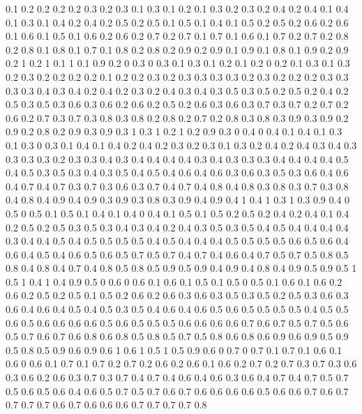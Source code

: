 0.1 0.2
0.2 0.2
0.2 0.3
0.2 0.3
0.1 0.3
0.1 0.2
0.1 0.3
0.2 0.3
0.2 0.4
0.2 0.4
0.1 0.4
0.1 0.3
0.1 0.4
0.2 0.4
0.2 0.5
0.2 0.5
0.1 0.5
0.1 0.4
0.1 0.5
0.2 0.5
0.2 0.6
0.2 0.6
0.1 0.6
0.1 0.5
0.1 0.6
0.2 0.6
0.2 0.7
0.2 0.7
0.1 0.7
0.1 0.6
0.1 0.7
0.2 0.7
0.2 0.8
0.2 0.8
0.1 0.8
0.1 0.7
0.1 0.8
0.2 0.8
0.2 0.9
0.2 0.9
0.1 0.9
0.1 0.8
0.1 0.9
0.2 0.9
0.2 1
0.2 1
0.1 1
0.1 0.9
0.2 0
0.3 0
0.3 0.1
0.3 0.1
0.2 0.1
0.2 0
0.2 0.1
0.3 0.1
0.3 0.2
0.3 0.2
0.2 0.2
0.2 0.1
0.2 0.2
0.3 0.2
0.3 0.3
0.3 0.3
0.2 0.3
0.2 0.2
0.2 0.3
0.3 0.3
0.3 0.4
0.3 0.4
0.2 0.4
0.2 0.3
0.2 0.4
0.3 0.4
0.3 0.5
0.3 0.5
0.2 0.5
0.2 0.4
0.2 0.5
0.3 0.5
0.3 0.6
0.3 0.6
0.2 0.6
0.2 0.5
0.2 0.6
0.3 0.6
0.3 0.7
0.3 0.7
0.2 0.7
0.2 0.6
0.2 0.7
0.3 0.7
0.3 0.8
0.3 0.8
0.2 0.8
0.2 0.7
0.2 0.8
0.3 0.8
0.3 0.9
0.3 0.9
0.2 0.9
0.2 0.8
0.2 0.9
0.3 0.9
0.3 1
0.3 1
0.2 1
0.2 0.9
0.3 0
0.4 0
0.4 0.1
0.4 0.1
0.3 0.1
0.3 0
0.3 0.1
0.4 0.1
0.4 0.2
0.4 0.2
0.3 0.2
0.3 0.1
0.3 0.2
0.4 0.2
0.4 0.3
0.4 0.3
0.3 0.3
0.3 0.2
0.3 0.3
0.4 0.3
0.4 0.4
0.4 0.4
0.3 0.4
0.3 0.3
0.3 0.4
0.4 0.4
0.4 0.5
0.4 0.5
0.3 0.5
0.3 0.4
0.3 0.5
0.4 0.5
0.4 0.6
0.4 0.6
0.3 0.6
0.3 0.5
0.3 0.6
0.4 0.6
0.4 0.7
0.4 0.7
0.3 0.7
0.3 0.6
0.3 0.7
0.4 0.7
0.4 0.8
0.4 0.8
0.3 0.8
0.3 0.7
0.3 0.8
0.4 0.8
0.4 0.9
0.4 0.9
0.3 0.9
0.3 0.8
0.3 0.9
0.4 0.9
0.4 1
0.4 1
0.3 1
0.3 0.9
0.4 0
0.5 0
0.5 0.1
0.5 0.1
0.4 0.1
0.4 0
0.4 0.1
0.5 0.1
0.5 0.2
0.5 0.2
0.4 0.2
0.4 0.1
0.4 0.2
0.5 0.2
0.5 0.3
0.5 0.3
0.4 0.3
0.4 0.2
0.4 0.3
0.5 0.3
0.5 0.4
0.5 0.4
0.4 0.4
0.4 0.3
0.4 0.4
0.5 0.4
0.5 0.5
0.5 0.5
0.4 0.5
0.4 0.4
0.4 0.5
0.5 0.5
0.5 0.6
0.5 0.6
0.4 0.6
0.4 0.5
0.4 0.6
0.5 0.6
0.5 0.7
0.5 0.7
0.4 0.7
0.4 0.6
0.4 0.7
0.5 0.7
0.5 0.8
0.5 0.8
0.4 0.8
0.4 0.7
0.4 0.8
0.5 0.8
0.5 0.9
0.5 0.9
0.4 0.9
0.4 0.8
0.4 0.9
0.5 0.9
0.5 1
0.5 1
0.4 1
0.4 0.9
0.5 0
0.6 0
0.6 0.1
0.6 0.1
0.5 0.1
0.5 0
0.5 0.1
0.6 0.1
0.6 0.2
0.6 0.2
0.5 0.2
0.5 0.1
0.5 0.2
0.6 0.2
0.6 0.3
0.6 0.3
0.5 0.3
0.5 0.2
0.5 0.3
0.6 0.3
0.6 0.4
0.6 0.4
0.5 0.4
0.5 0.3
0.5 0.4
0.6 0.4
0.6 0.5
0.6 0.5
0.5 0.5
0.5 0.4
0.5 0.5
0.6 0.5
0.6 0.6
0.6 0.6
0.5 0.6
0.5 0.5
0.5 0.6
0.6 0.6
0.6 0.7
0.6 0.7
0.5 0.7
0.5 0.6
0.5 0.7
0.6 0.7
0.6 0.8
0.6 0.8
0.5 0.8
0.5 0.7
0.5 0.8
0.6 0.8
0.6 0.9
0.6 0.9
0.5 0.9
0.5 0.8
0.5 0.9
0.6 0.9
0.6 1
0.6 1
0.5 1
0.5 0.9
0.6 0
0.7 0
0.7 0.1
0.7 0.1
0.6 0.1
0.6 0
0.6 0.1
0.7 0.1
0.7 0.2
0.7 0.2
0.6 0.2
0.6 0.1
0.6 0.2
0.7 0.2
0.7 0.3
0.7 0.3
0.6 0.3
0.6 0.2
0.6 0.3
0.7 0.3
0.7 0.4
0.7 0.4
0.6 0.4
0.6 0.3
0.6 0.4
0.7 0.4
0.7 0.5
0.7 0.5
0.6 0.5
0.6 0.4
0.6 0.5
0.7 0.5
0.7 0.6
0.7 0.6
0.6 0.6
0.6 0.5
0.6 0.6
0.7 0.6
0.7 0.7
0.7 0.7
0.6 0.7
0.6 0.6
0.6 0.7
0.7 0.7
0.7 0.8
